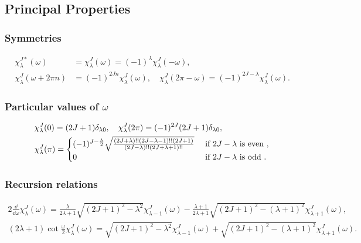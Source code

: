 \subsection{Principal Properties}\label{sec:4.15.3}
\subsubsection{ Symmetries}
\begin{align}
\chi_{\lambda}^{J *}(\omega) & =\chi_{\lambda}^{J}(\omega)=(-1)^{\lambda} \chi_{\lambda}^{J}(-\omega)  ,\label{eq:4:15:19}\\
\chi_{\lambda}^{J}(\omega+2 \pi n) & =(-1)^{2 J n} \chi_{\lambda}^{J}(\omega), \quad \chi_{\lambda}^{J}(2 \pi-\omega)=(-1)^{2 J-\lambda} \chi_{\lambda}^{J}(\omega). \label{eq:4:15:20}
\end{align}
\subsubsection{ Particular values of $\omega$}
\begin{align}
& \chi_{\lambda}^{J}(0)=(2 J+1) \delta_{\lambda 0}, \quad \chi_{\lambda}^{J}(2 \pi)=(-1)^{2 J}(2 J+1) \delta_{\lambda 0},  \notag\\
& \chi_{\lambda}^{J}(\pi)= \begin{cases}(-1)^{J-\frac{\lambda}{2}} \sqrt{\frac{(2 J+\lambda)!!(2 J-\lambda-1)!!(2 J+1)}{(2 J-\lambda)!!(2 J+\lambda+1)!!}} & \text { if } 2 J-\lambda \text { is even }, \\
0 & \text { if } 2 J-\lambda \text { is odd } .\end{cases} \label{eq:4:15:21}
\end{align}
\subsubsection{ Recursion relations}
\begin{gather}
2 \frac{\dd}{\dd \omega} \chi_{\lambda}^{J}(\omega)=\frac{\lambda}{2 \lambda+1} \sqrt{(2 J+1)^{2}-\lambda^{2}} \chi_{\lambda-1}^{J}(\omega)-\frac{\lambda+1}{2 \lambda+1} \sqrt{(2 J+1)^{2}-(\lambda+1)^{2}} \chi_{\lambda+1}^{J}(\omega),  \label{eq:4:15:22}\\
(2 \lambda+1) \cot \frac{\omega}{2} \chi_{\lambda}^{J}(\omega)=\sqrt{(2 J+1)^{2}-\lambda^{2}} \chi_{\lambda-1}^{J}(\omega)+\sqrt{(2 J+1)^{2}-(\lambda+1)^{2}} \chi_{\lambda+1}^{J}(\omega) . \label{eq:4:15:23}
\end{gather}
